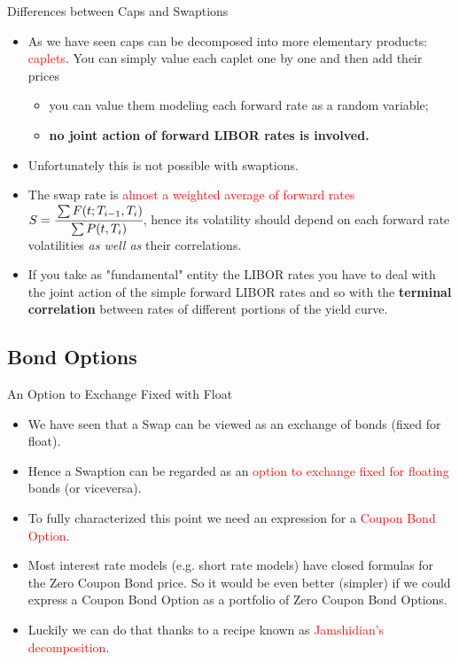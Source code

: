 \documentclass{beamer}
\begin{document}
\begin{frame}{Differences between Caps and Swaptions}
\begin{itemize}
	\item<1-> As we have seen caps can be decomposed into more elementary products: \textcolor{red}{caplets}. You can simply value each caplet one by one and then add their prices
	\begin{itemize}
		\item you can value them modeling each forward rate as a random variable;
		\item \textbf{no joint action of forward LIBOR rates is involved.}
	\end{itemize}
	\item<2-> Unfortunately this is not possible with swaptions.
	\item<3-> The swap rate is \textcolor{red}{almost a weighted average of forward rates} $S=\cfrac{\sum F(t;T_{i-1},T_i)}{\sum P(t,T_i)}$, hence its volatility should depend on each forward rate volatilities \emph{as well as} their correlations.
	\item<4-> If you take as "fundamental" entity the LIBOR rates you have to deal with the joint action of the simple forward LIBOR rates and so with the \textbf{terminal correlation} between rates of different portions of the yield curve. 
\end{itemize}
\end{frame}

\subsection{Bond Options}
\begin{frame}{An Option to Exchange Fixed with Float}
\begin{itemize}
	\item<1-> We have seen that a Swap can be viewed as an exchange of bonds (fixed for float).
	\item<2-> Hence a Swaption can be regarded as an \textcolor{red}{option to exchange fixed for floating} bonds (or viceversa).
	\item<3-> To fully characterized this point we need an expression for a \textcolor{red}{Coupon Bond Option}.
	\item <4->Most interest rate models (e.g. short rate models) have closed formulas for the Zero Coupon Bond price. So it would be even better (simpler) if we could express a Coupon Bond Option as a portfolio of Zero Coupon Bond Options.
	\item<5-> Luckily we can do that thanks to a recipe known as \textcolor{red}{Jamshidian's decomposition}.
\end{itemize}
\end{frame}
\end{document}
